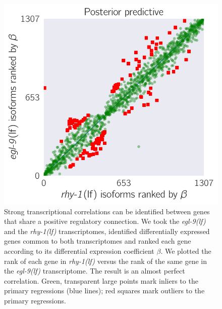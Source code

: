 \documentclass[9pt,twocolumn,twoside]{pnas-new}
\newcommand{\egl}{\emph{\mbox{egl-9}(lf)}}
\newcommand{\rhy}{\emph{\mbox{rhy-1}(lf)}}
\begin{document}
\begin{figure}%
\centering
\includegraphics[width=\linewidth]{figs/multiplemodes-eb.pdf}
\caption{
Strong transcriptional correlations can be identified between genes
that share a positive regulatory connection. We took the \egl{} and the \rhy{}
transcriptomes, identified differentially expressed genes common to both
transcriptomes and ranked each gene according to its differential expression
coefficient $\beta$. We plotted the rank of each gene in \rhy{} versus the
rank of the same gene in the \egl{} transcriptome. The result is an almost
perfect correlation. Green, transparent large points mark inliers to the primary
regressions (blue lines); red squares mark outliers to the primary regressions.
}
\label{fig:genetic_interactions}
\end{figure}
\end{document}
